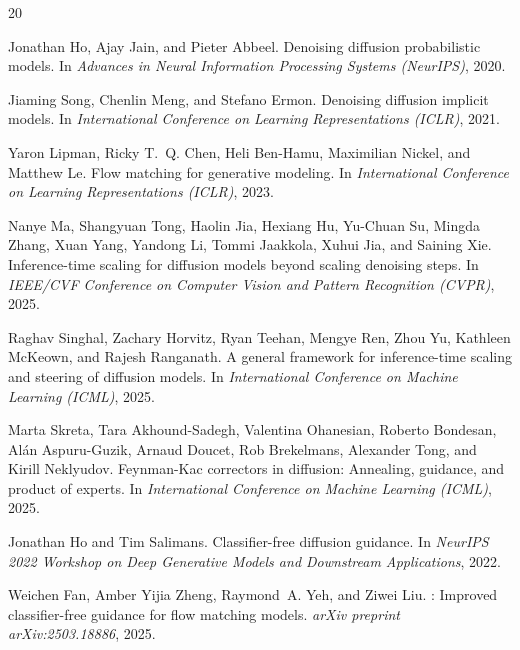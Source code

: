 \documentclass{article}
\begin{document}
\begin{thebibliography}{20}

Jonathan Ho, Ajay Jain, and Pieter Abbeel.
\newblock Denoising diffusion probabilistic models.
\newblock In \emph{Advances in Neural Information Processing Systems (NeurIPS)}, 2020.

Jiaming Song, Chenlin Meng, and Stefano Ermon.
\newblock Denoising diffusion implicit models.
\newblock In \emph{International Conference on Learning Representations (ICLR)}, 2021.

Yaron Lipman, Ricky T.~Q. Chen, Heli Ben-Hamu, Maximilian Nickel, and Matthew Le.
\newblock Flow matching for generative modeling.
\newblock In \emph{International Conference on Learning Representations (ICLR)}, 2023.

Nanye Ma, Shangyuan Tong, Haolin Jia, Hexiang Hu, Yu-Chuan Su, Mingda Zhang, Xuan Yang, Yandong Li, Tommi Jaakkola, Xuhui Jia, and Saining Xie.
\newblock Inference-time scaling for diffusion models beyond scaling denoising steps.
\newblock In \emph{IEEE/CVF Conference on Computer Vision and Pattern Recognition (CVPR)}, 2025.

Raghav Singhal, Zachary Horvitz, Ryan Teehan, Mengye Ren, Zhou Yu, Kathleen McKeown, and Rajesh Ranganath.
\newblock A general framework for inference-time scaling and steering of diffusion models.
\newblock In \emph{International Conference on Machine Learning (ICML)}, 2025.

Marta Skreta, Tara Akhound-Sadegh, Valentina Ohanesian, Roberto Bondesan, Al{\'a}n Aspuru-Guzik, Arnaud Doucet, Rob Brekelmans, Alexander Tong, and Kirill Neklyudov.
\newblock Feynman-{K}ac correctors in diffusion: Annealing, guidance, and product of experts.
\newblock In \emph{International Conference on Machine Learning (ICML)}, 2025.

Jonathan Ho and Tim Salimans.
\newblock Classifier-free diffusion guidance.
\newblock In \emph{NeurIPS 2022 Workshop on Deep Generative Models and Downstream Applications}, 2022.

Weichen Fan, Amber Yijia Zheng, Raymond~A. Yeh, and Ziwei Liu.
: Improved classifier-free guidance for flow matching models.
\newblock \emph{arXiv preprint arXiv:2503.18886}, 2025.


\end{thebibliography}
\end{document}
